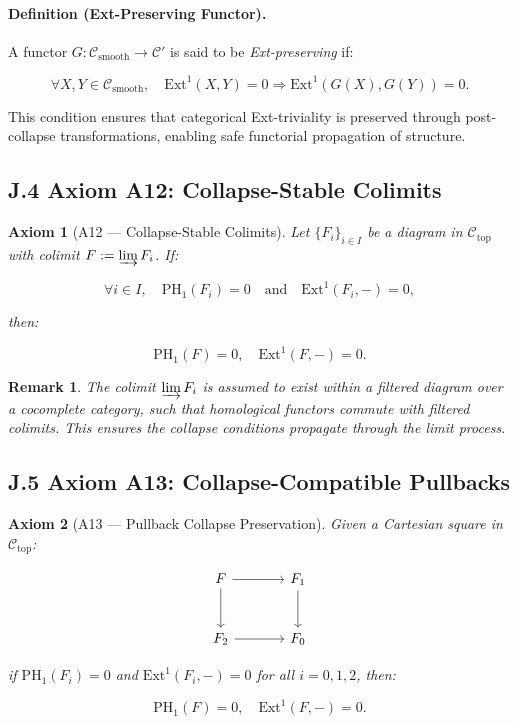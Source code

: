 \documentclass[11pt]{article}
\newtheorem{remark}[theorem]{Remark}
\newtheorem{axiom}{Axiom}[section]
\begin{document}
\paragraph{Definition (Ext-Preserving Functor).}
A functor \( G : \mathcal{C}_{\mathrm{smooth}} \to \mathcal{C}' \) is said to be \emph{Ext-preserving} if:

\[
\forall X, Y \in \mathcal{C}_{\mathrm{smooth}},\quad \mathrm{Ext}^1(X, Y) = 0 \Rightarrow \mathrm{Ext}^1(G(X), G(Y)) = 0.
\]

This condition ensures that categorical Ext-triviality is preserved through post-collapse transformations, enabling safe functorial propagation of structure.

\subsection*{J.4 Axiom A12: Collapse-Stable Colimits}

\begin{axiom}[A12 — Collapse-Stable Colimits]
Let \( \{ F_i \}_{i \in I} \) be a diagram in \( \mathcal{C}_{\mathrm{top}} \) with colimit \( F := \varinjlim F_i \). If:

\[
\forall i \in I, \quad \mathrm{PH}_1(F_i) = 0 \quad \text{and} \quad \mathrm{Ext}^1(F_i, -) = 0,
\]

then:

\[
\mathrm{PH}_1(F) = 0, \quad \mathrm{Ext}^1(F, -) = 0.
\]
\end{axiom}

\begin{remark}
The colimit \( \varinjlim F_i \) is assumed to exist within a filtered diagram over a cocomplete category, such that homological functors commute with filtered colimits. This ensures the collapse conditions propagate through the limit process.
\end{remark}

\subsection*{J.5 Axiom A13: Collapse-Compatible Pullbacks}

\begin{axiom}[A13 — Pullback Collapse Preservation]
Given a Cartesian square in \( \mathcal{C}_{\mathrm{top}} \):

\[
\begin{tikzcd}[row sep=large, column sep=large]
F \arrow[r] \arrow[d] & F_1 \arrow[d] \\
F_2 \arrow[r] & F_0
\end{tikzcd}
\]

if \( \mathrm{PH}_1(F_i) = 0 \) and \( \mathrm{Ext}^1(F_i, -) = 0 \) for all \( i = 0, 1, 2 \), then:

\[
\mathrm{PH}_1(F) = 0, \quad \mathrm{Ext}^1(F, -) = 0.
\]
\end{axiom}
\end{document}
